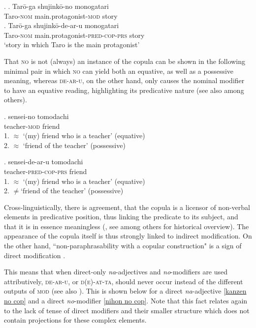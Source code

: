 \documentclass [output=book,colorlinks,citecolor=brown]{langscibook}
\begin{document}
\newpage

\ex. \label{taro convenience} \ag. Tarō-ga shujinkō-no monogatari\\
Taro-\textsc{nom} main.protagonist-\textsc{mod} story\\
\bg. Tarō-ga shujinkō-de-ar-u monogatari\\
Taro-\textsc{nom} main.protagonist-\textsc{pred-cop-prs} story\\
`story in which Taro is the main protagonist' \\ \null \hfill \citep[66]{watanabe:2010:notes}

That \textsc{no} is not (always) an instance of the copula can be shown in the following minimal pair in which \textsc{no} can yield both an equative, as well as a possessive meaning, whereas \textsc{de-ar-u}, on the other hand, only causes the nominal modifier to have an equative reading, highlighting its predicative nature (see also \citealt{kato:2003:nihongo} among others). %

\exg. sensei-no tomodachi\\
teacher-\textsc{mod} friend\\
1. $\approx$ `(my) friend who is a teacher' (equative)\\
2. $\approx$ `friend of the teacher' (possessive) \label{senseino}

\exg. sensei-de-ar-u tomodachi\\
teacher-\textsc{pred-cop-prs} friend\\
1. $\approx$ `(my) friend who is a teacher' (equative)\\
2. $\neq$`friend of the teacher' (possessive)

Cross-linguistically, there is agreement, that the copula is a licensor of non-verbal elements in predicative position, thus linking the predicate to its subject, and that it is in essence meaningless (\citealt[1–6]{arche:2019:main}, see \citealt{moro:1997:raising, moro:2000:dynamic, bowers:2002:pred} among others for historical overview). The appearance of the copula itself is thus strongly linked to indirect modification. On the other hand, ``non-paraphrasability with a copular construction" is a sign of direct modification \citep[291–292]{alex:2007:nounphrase}. %

This means that when direct-only \textit{na}-adjectives and \textit{no}-modifiers are used attributively, \textsc{de-ar-u}, or \textsc{d(e)-at-ta}, should never occur instead of the different outputs of \textsc{mod} (see also \citealt{ayano:2010:revisiting}). This is shown below for a direct \textit{na}-adjective \ref{kanzen no cop} and a direct \textit{no}-modifier \ref{nihon no cop}. Note that this fact relates again to the lack of tense of direct modifiers and their smaller structure which does not contain projections for these complex elements. %
\end{document}
